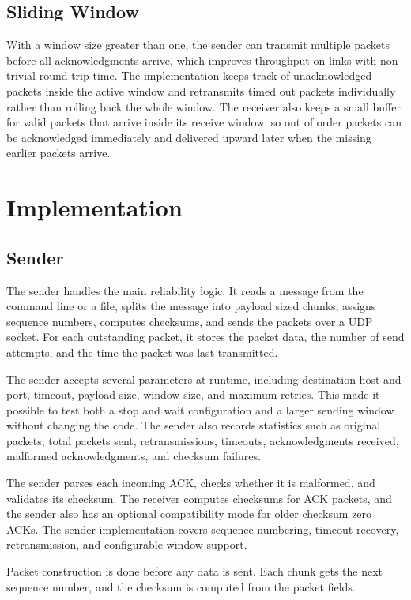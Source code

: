 \documentclass[conference]{IEEEtran}
\begin{document}
\subsection{Sliding Window}
With a window size greater than one, the sender can transmit multiple packets
before all acknowledgments arrive, which improves throughput on links with
non-trivial round-trip time. The implementation keeps track of unacknowledged
packets inside the active window and retransmits timed out packets
individually rather than rolling back the whole window. The receiver also
keeps a small buffer for valid packets that arrive inside its receive window,
so out of order packets can be acknowledged immediately and delivered upward
later when the missing earlier packets arrive.

\section{Implementation}

\subsection{Sender}
The sender handles the main reliability logic. It reads a message from the
command line or a file, splits the message into payload sized chunks, assigns
sequence numbers, computes checksums, and sends the packets over a UDP socket.
For each outstanding packet, it stores the packet data, the number of send
attempts, and the time the packet was last transmitted.

The sender accepts several parameters at runtime, including destination host and
port, timeout, payload size, window size, and maximum retries. This made it
possible to test both a stop and wait configuration and a larger sending window
without changing the code. The sender also records statistics such as original
packets, total packets sent, retransmissions, timeouts, acknowledgments
received, malformed acknowledgments, and checksum failures.

The sender parses each incoming ACK, checks whether it is malformed, and
validates its checksum. The receiver computes checksums for ACK packets, and the
sender also has an optional compatibility mode for older checksum zero ACKs.
The sender implementation covers sequence numbering, timeout recovery,
retransmission, and configurable window support.

Packet construction is done before any data is sent. Each chunk gets the next
sequence number, and the checksum is computed from the packet fields.
\end{document}
